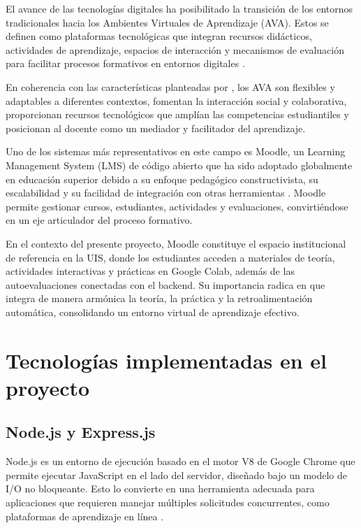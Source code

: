\documentclass[letter,oneside,12pt,spanish]{report}
\begin{document}
El avance de las tecnologías digitales ha posibilitado la transición de los entornos tradicionales hacia los Ambientes Virtuales de Aprendizaje (AVA). Estos se definen como plataformas tecnológicas que integran recursos didácticos, actividades de aprendizaje, espacios de interacción y mecanismos de evaluación para facilitar procesos formativos en entornos digitales \parencite{salinas2004}.

En coherencia con las características planteadas por \textcite{castro2019}, los AVA son flexibles y adaptables a diferentes contextos, fomentan la interacción social y colaborativa, proporcionan recursos tecnológicos que amplían las competencias estudiantiles y posicionan al docente como un mediador y facilitador del aprendizaje.

Uno de los sistemas más representativos en este campo es Moodle, un Learning Management System (LMS) de código abierto que ha sido adoptado globalmente en educación superior debido a su enfoque pedagógico constructivista, su escalabilidad y su facilidad de integración con otras herramientas \parencite{dougiamas2003}. Moodle permite gestionar cursos, estudiantes, actividades y evaluaciones, convirtiéndose en un eje articulador del proceso formativo.

En el contexto del presente proyecto, Moodle constituye el espacio institucional de referencia en la UIS, donde los estudiantes acceden a materiales de teoría, actividades interactivas y prácticas en Google Colab, además de las autoevaluaciones conectadas con el backend. Su importancia radica en que integra de manera armónica la teoría, la práctica y la retroalimentación automática, consolidando un entorno virtual de aprendizaje efectivo.


\section{Tecnologías implementadas en el proyecto}

\subsection{Node.js y Express.js}

Node.js es un entorno de ejecución basado en el motor V8 de Google Chrome que permite ejecutar JavaScript en el lado del servidor, diseñado bajo un modelo de I/O no bloqueante. Esto lo convierte en una herramienta adecuada para aplicaciones que requieren manejar múltiples solicitudes concurrentes, como plataformas de aprendizaje en línea \parencite{tilkov2010}.
\end{document}
